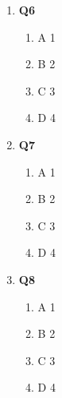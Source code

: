 \documentclass{article}
\begin{document}
\begin{enumerate}
 \item
  \textbf{Q6}

  \begin{enumerate}
    \item
	A \hfill 1
    \item
    	B \hfill 2
    \item
    	C \hfill 3
     \item
     	D \hfill 4
  \end{enumerate}

  \item
  \textbf{Q7}
 
  \begin{enumerate}
    \item
	A \hfill 1
    \item
    	B \hfill 2
    \item
    	C \hfill 3
     \item
     	D \hfill 4
  \end{enumerate}

 \item
  \textbf{Q8}

  \begin{enumerate}
    \item
	A \hfill 1
    \item
    	B \hfill 2
    \item
    	C \hfill 3
     \item
     	D \hfill 4
  \end{enumerate}
  
\end{enumerate}
\end{document}
